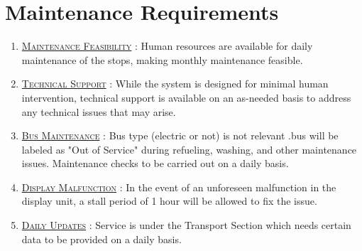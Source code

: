 \section{Maintenance Requirements}

\begin{enumerate}
    \item \underline{\textsc{Maintenance Feasibility}} : Human resources are available for daily maintenance of the stops, making monthly maintenance feasible.

    \item {}\underline{\textsc{Technical Support}} : While the system is designed for minimal human intervention, technical support is available on an as-needed basis to address any technical issues that may arise.

    \item \underline{\textsc{Bus Maintenance}} : Bus type (electric or not) is not relevant .bus will be labeled as "Out of Service" during refueling, washing, and other maintenance issues. Maintenance checks to be carried out on a daily basis. 

    \item {}\underline{\textsc{Display Malfunction}} : In the event of an unforeseen malfunction in the display unit, a stall period of 1 hour will be allowed to fix the issue.

    \item \underline{\textsc{Daily Updates}} : Service is under the Transport Section which needs certain data to be provided on a daily basis.
\end{enumerate}